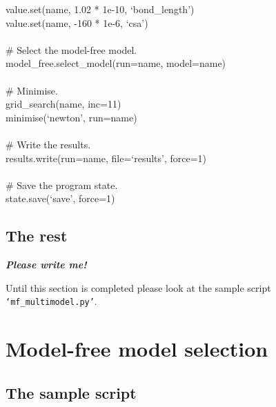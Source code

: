 \begin{exampleenv}
\hspace*{4ex} value.set(name, 1.02 * 1e-10, `bond\_length') \\
\hspace*{4ex} value.set(name, -160 * 1e-6, `csa') \\
 \\
\hspace*{4ex} \# Select the model-free model. \\
\hspace*{4ex} model\_free.select\_model(run=name, model=name) \\
 \\
\hspace*{4ex} \# Minimise. \\
\hspace*{4ex} grid\_search(name, inc=11) \\
\hspace*{4ex} minimise(`newton', run=name) \\
 \\
\hspace*{4ex} \# Write the results. \\
\hspace*{4ex} results.write(run=name, file=`results', force=1) \\
 \\
\# Save the program state. \\
state.save(`save', force=1)
\end{exampleenv}



\subsection{The rest}

\textbf{\textit{Please write me!}}

Until this section is completed please look at the sample script \texttt{`mf\_multimodel.py'}.




\section{Model-free model selection}



\subsection{The sample script}

